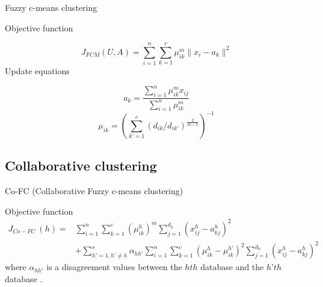 \documentclass[compress,sky blue]{beamer}
\begin{document}
\begin{frame}{Fuzzy c-means clustering}
	\vspace{-0.3cm}	
    
Objective function 

	\begin{equation}
            J_{FCM}(U, A)  = \sum_{i=1}^{n}\sum_{k=1} ^{c}\mu_{ik}^{m}\|x_{i}-a_{k}\|^2
            \label{updateU} %
        \end{equation}
Update equations

	\begin{equation}
            a_{k}  = \frac{\sum_{i=1}^{n}\mu_{ik}^{m}x_{ij}} {\sum_{i=1}^{n}\mu_{ik}^{m}}
            \label{updateA} %
        \end{equation}
        \begin{equation}
            \mu_{ik}  = \left ({\sum_{k’=1}^{c} ( d_{ik}/d_{ik'})^\frac{2} 
            {m-1}}\right)^{-1}   
            \label{updateU} %
        \end{equation}


\end{frame}



\subsection{Collaborative clustering}


\begin{frame}{Co-FC (Collaborative Fuzzy c-means clustering)}
	\vspace{-0.3cm}	
    
Objective function     
 \begin{equation}
\begin{aligned}
J_{Co-FC} \ (h)  ={} & \sum_{i=1}^{n}\sum_{k=1}^{c} \left(\mu_{ik}^{h} \right)^{m} \sum_{j=1}^{d_{h}} \left(x_{ij}^{h}-a_{kj}^{h}\right)^2  \\
      &   + \sum_{h'=1, h'\neq h}^{s} \alpha_{hh'} \sum_{i=1}^{n}\sum_{k=1}^{c}\left( \mu_{ik}^{h}-\mu_{ik}^{h'} \right )^{2}\sum_{j=1}^{d_{h}} \left(x_{ij}^{h}-a_{kj}^{h}\right)^2
\end{aligned}
\label{CoFC1} 
\end{equation}
where $\alpha_{hh'}$ is a disagreement values between the $hth$ database and the $h’th$ database \cite{Pedrycz2002CollaborativeClustering}. 

\end{frame}
\end{document}

